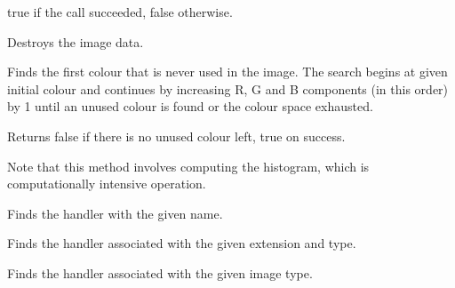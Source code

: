 
true if the call succeeded, false otherwise.


\label{wximagedestroy}


Destroys the image data.


\label{wximagefindfirstunusedcolour}





Finds the first colour that is never used in the image. The search begins at
given initial colour and continues by increasing R, G and B components (in this
order) by 1 until an unused colour is found or the colour space exhausted.


Returns false if there is no unused colour left, true on success.


Note that this method involves computing the histogram, which is
computationally intensive operation.


\label{wximagefindhandler}


Finds the handler with the given name.


Finds the handler associated with the given extension and type.


Finds the handler associated with the given image type.


